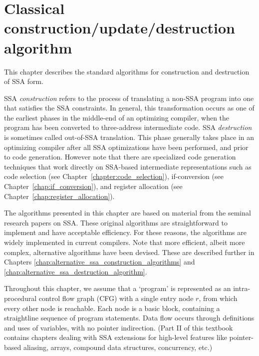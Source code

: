 \chapter{Classical construction/update/destruction algorithm }
\label{chap:classical_construction}

\graphicspath{{Figures/}{classical_construction_algorithm/Figures/}{part1/classical_construction_algorithm/Figures/}}


\def\phiops{$\phi$-functions}
\def\phiop{$\phi$-function}

\def\undef{\perp}
\def\DF{\mathrm{DF}}
\def\iDF{\mathrm{iDF}}
\def\join{\cup}


This chapter describes the standard algorithms for construction and
destruction of SSA form.

SSA \emph{construction} refers to the process of translating a non-SSA program into
one that satisfies the SSA constraints. In general, this transformation
occurs as one of the
earliest phases in the middle-end of an optimizing compiler, when the program
has been converted to three-address intermediate code.
SSA \emph{destruction} is sometimes called out-of-SSA translation. This phase
generally
takes place in an optimizing compiler after all SSA optimizations have
been performed, and prior to code generation. However note that there are
specialized code generation techniques that work directly on SSA-based
intermediate representations such as code selection (see
Chapter~\ref{chapter:code_selection}), if-conversion (see
Chapter~\ref{chap:if_conversion}),
and register allocation (see Chapter~\ref{chap:register_allocation}).

The algorithms presented in this chapter are
based on material from the seminal research papers on SSA.
These original algorithms are 
straightforward to implement and have acceptable efficiency.
For these reasons, the algorithms
are widely implemented in current compilers.
Note that more
efficient, albeit more complex, alternative algorithms have been devised.
These are described further in Chapters 
\ref{chap:alternative_ssa_construction_algorithms}
and
\ref{chap:alternative_ssa_destruction_algorithm}.

Throughout this chapter,
we assume that a `program' is represented as an
intra-procedural control flow graph (CFG)
with a single entry node $r$, from which every other
node is reachable.
Each node is a basic block, containing a straightline
sequence of program statements.
Data flow occurs through definitions and uses of 
variables, with no pointer indirection.
(Part II of this textbook contains chapters dealing with
SSA extensions for high-level features like
pointer-based aliasing, arrays, compound data structures, concurrency, etc.)

